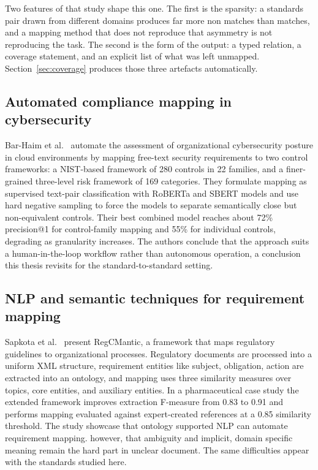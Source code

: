 Two features of that study shape this one. The first is the sparsity: a
standards pair drawn from different domains produces far more non matches than
matches, and a mapping method that does not reproduce that asymmetry is not
reproducing the task. The second is the form of the output: a typed
relation, a coverage statement, and an explicit list of what was left unmapped.
Section~\ref{sec:coverage} produces those three artefacts automatically.

\subsection{Automated compliance mapping in cybersecurity}

Bar-Haim et al.~\cite{barhaim2023cloud} automate the assessment of
organizational cybersecurity posture in cloud environments by mapping
free-text security requirements to two control frameworks: a NIST-based
framework of 280 controls in 22 families, and a finer-grained three-level risk
framework of 169 categories. They formulate mapping as supervised text-pair
classification with RoBERTa and SBERT models and use hard negative sampling to
force the models to separate semantically close but non-equivalent controls.
Their best combined model reaches about 72\% precision@1 for control-family
mapping and 55\% for individual controls, degrading as granularity increases.
The authors conclude that the approach suits a human-in-the-loop workflow
rather than autonomous operation, a conclusion this thesis revisits for the
standard-to-standard setting.

\subsection{NLP and semantic techniques for requirement mapping}

Sapkota et al.~\cite{sapkota2016regcmantic} present RegCMantic, a framework
that maps regulatory guidelines to organizational processes. Regulatory
documents are processed into a uniform XML structure, requirement entities like 
subject, obligation, action are extracted into an ontology, and mapping uses
three similarity measures over topics, core entities, and auxiliary entities.
In a pharmaceutical case study the extended framework improves extraction
F-measure from 0.83 to 0.91 and performs mapping evaluated against
expert-created references at a 0.85 similarity threshold. The study
showcase that ontology supported NLP can automate requirement mapping.
however, that ambiguity and implicit, domain specific meaning remain the
hard part in unclear document. The same difficulties appear with the standards studied here.

